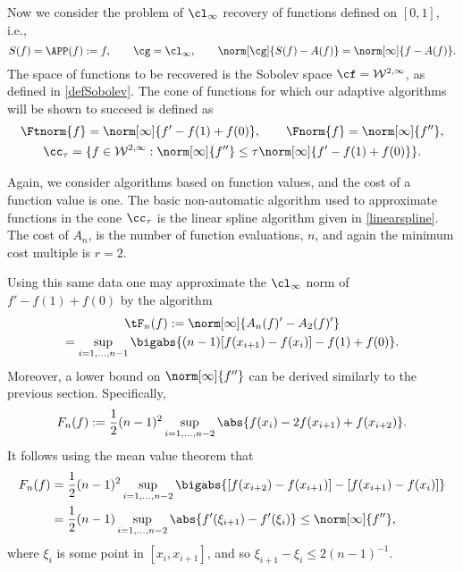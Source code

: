 Now we consider the problem of $\cl_{\infty}$ recovery of functions defined on $[0,1]$, i.e.,
\[
S(f)=\APP(f):=f, \qquad \cg=\cl_{\infty}, \qquad \norm[\cg]{S(f)-A(f)}=\norm[\infty]{f-A(f)}.
\]
The space of functions to be recovered is the Sobolev space $\cf = \mathcal{W}^{2,\infty}$, as defined in \eqref{defSobolev}.  The cone of functions for which our adaptive algorithms will be shown to succeed is defined as
\begin{subequations} \label{coneappxdef}
\begin{gather}
\Ftnorm{f}=\norm[\infty]{f'-f(1)+f(0)}, \qquad \Fnorm{f}=\norm[\infty]{f''}, \\
\cc_{\tau}=\{f \in  \mathcal{W}^{2,\infty} : \norm[\infty]{f''}\leq \tau\norm[\infty]{f'-f(1)+f(0)}\}.
\end{gather}
\end{subequations}

Again, we consider algorithms based on function values, and the cost of a function value is one.   The basic non-automatic algorithm used to approximate functions in the cone $\cc_{\tau}$ is the linear spline algorithm given in \eqref{linearspline}.  
The cost of $A_n$, is the number of function evaluations, $n$, and again the minimum cost multiple is $r=2$.

Using this same data one may approximate the $\cl_\infty$ norm of $f'-f(1)+f(0)$ by the algorithm
\begin{multline}\label{estfirstderiv}
\tF_n(f) := \norm[\infty]{A_n(f)' - A_2(f)'} \\
= \sup_{i=1, \ldots, n-1} \bigabs{(n-1) [f(x_{i+1})-f(x_i)]-f(1)+f(0)}.
\end{multline}
Moreover, a lower bound on $\norm[\infty]{f''}$ can be derived similarly to the previous section.  Specifically,
\begin{equation} \label{Fnormappxalg}
F_n(f) := \frac 1 2 (n-1)^2\sup_{i=1, \ldots, n-2} \abs{f(x_i) - 2 f(x_{i+1})+f(x_{i+2})}.
\end{equation}
It follows using the mean value theorem that 
\begin{align*}
F_n(f) &= \frac 1 2 (n-1)^2\sup_{i=1, \ldots, n-2} \bigabs{[f(x_{i+2}) - f(x_{i+1})] - [f(x_{i+1}) - f(x_{i})]} \\
&= \frac 1 2 (n-1)\sup_{i=1, \ldots, n-2} \abs{f'(\xi_{i+1}) - f'(\xi_{i})} \le \norm[\infty]{f''},
\end{align*}
where $\xi_i$ is some point in $[x_i,x_{i+1}]$, and so $\xi_{i+1} - \xi_i \le 2(n-1)^{-1}$.

